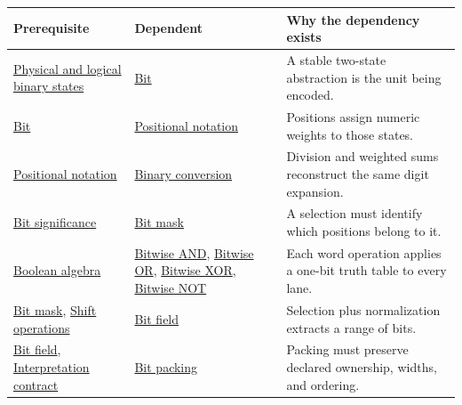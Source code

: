 {\def\LTcaptype{none} %
\begin{longtable}[]{@{}
  >{\raggedright\arraybackslash}p{}
  >{\raggedright\arraybackslash}p{}
  >{\raggedright\arraybackslash}p{}@{}}
\toprule\noalign{}
\begin{minipage}[b]{\linewidth}\raggedright
Prerequisite
\end{minipage} & \begin{minipage}[b]{\linewidth}\raggedright
Dependent
\end{minipage} & \begin{minipage}[b]{\linewidth}\raggedright
Why the dependency exists
\end{minipage} \\
\midrule\noalign{}
\endhead
\bottomrule\noalign{}
\endlastfoot
\hyperref[appendix-ea798b1ceb35]{Physical and logical binary states} & \hyperref[appendix-ddbb69998a2e]{Bit} & A stable two-state abstraction is the unit being encoded. \\
\hyperref[appendix-ddbb69998a2e]{Bit} & \hyperref[appendix-83c3f28f7bda]{Positional notation} & Positions assign numeric weights to those states. \\
\hyperref[appendix-83c3f28f7bda]{Positional notation} & \hyperref[appendix-dc552784a2c0]{Binary conversion} & Division and weighted sums reconstruct the same digit expansion. \\
\hyperref[appendix-280445746493]{Bit significance} & \hyperref[appendix-dbe5905163c2]{Bit mask} & A selection must identify which positions belong to it. \\
\hyperref[appendix-24475e1596a8]{Boolean algebra} & \hyperref[appendix-68b52453737c]{Bitwise AND}, \hyperref[appendix-a427ce8ce8a6]{Bitwise OR}, \hyperref[appendix-d49161831368]{Bitwise XOR}, \hyperref[appendix-8f38927cfc54]{Bitwise NOT} & Each word operation applies a one-bit truth table to every lane. \\
\hyperref[appendix-dbe5905163c2]{Bit mask}, \hyperref[appendix-73425b25118e]{Shift operations} & \hyperref[appendix-ac697f5c66e8]{Bit field} & Selection plus normalization extracts a range of bits. \\
\hyperref[appendix-ac697f5c66e8]{Bit field}, \hyperref[appendix-f414bd4ed05c]{Interpretation contract} & \hyperref[appendix-1f9963e1a5d1]{Bit packing} & Packing must preserve declared ownership, widths, and ordering. \\

\end{longtable}}
